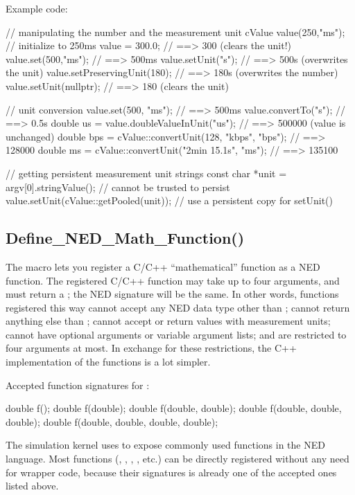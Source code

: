 Example code:

\begin{cpp}
// manipulating the number and the measurement unit
cValue value(250,"ms");    // initialize to 250ms
value = 300.0;                // ==> 300 (clears the unit!)
value.set(500,"ms");          // ==> 500ms
value.setUnit("s");           // ==> 500s (overwrites the unit)
value.setPreservingUnit(180); // ==> 180s (overwrites the number)
value.setUnit(nullptr);       // ==> 180 (clears the unit)

// unit conversion
value.set(500, "ms");         // ==> 500ms
value.convertTo("s");         // ==> 0.5s
double us = value.doubleValueInUnit("us"); // ==> 500000 (value is unchanged)
double bps = cValue::convertUnit(128, "kbps", "bps"); // ==> 128000
double ms = cValue::convertUnit("2min 15.1s", "ms"); // ==> 135100

// getting persistent measurement unit strings
const char *unit = argv[0].stringValue(); // cannot be trusted to persist
value.setUnit(cValue::getPooled(unit)); // use a persistent copy for setUnit()
\end{cpp}


\subsection{Define\_NED\_Math\_Function()}
\label{sec:sim-lib:define-ned-math-function}

The  macro lets you register a C/C++
``mathematical'' function as a NED function. The registered C/C++ function
may take up to four  arguments, and must return a ;
the NED signature will be the same. In other words, functions registered
this way cannot accept any NED data type other than ; cannot
return anything else than ; cannot accept or return values with
measurement units; cannot have optional arguments or variable argument
lists; and are restricted to four arguments at most. In exchange for these
restrictions, the C++ implementation of the functions is a lot simpler.

Accepted function signatures for :

\begin{cpp}
double f();
double f(double);
double f(double, double);
double f(double, double, double);
double f(double, double, double, double);
\end{cpp}

The simulation kernel uses  to expose
commonly used  functions in the NED language. Most 
functions (, , , , etc.)
can be directly registered without any need for wrapper code, because their
signatures is already one of the accepted ones listed above.

